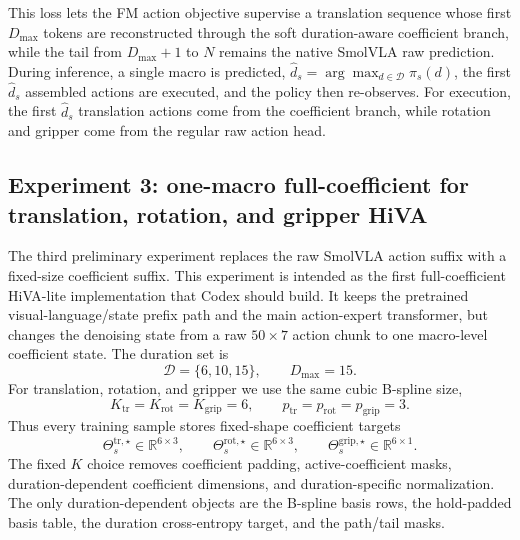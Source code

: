 \documentclass[10pt,twocolumn,letterpaper]{article}
\begin{document}
This loss lets the FM action objective supervise a translation sequence whose first $D_{\max}$ tokens are reconstructed through the soft duration-aware coefficient branch, while the tail from $D_{\max}+1$ to $N$ remains the native SmolVLA raw prediction. During inference, a single macro is predicted, $\hat d_s=\arg\max_{d\in\mathcal{D}}\pi_s(d)$, the first $\hat d_s$ assembled actions are executed, and the policy then re-observes. For execution, the first $\hat d_s$ translation actions come from the coefficient branch, while rotation and gripper come from the regular raw action head.

\subsection{Experiment 3: one-macro full-coefficient for translation, rotation, and gripper HiVA}
\label{app:exp-one-macro-full-coeff}
The third preliminary experiment replaces the raw SmolVLA action suffix with a fixed-size coefficient suffix. This experiment is intended as the first full-coefficient HiVA-lite implementation that Codex should build. It keeps the pretrained visual-language/state prefix path and the main action-expert transformer, but changes the denoising state from a raw $50\times 7$ action chunk to one macro-level coefficient state. The duration set is
\begin{equation}
\mathcal{D}=\{6,10,15\},
\qquad D_{\max}=15.
\end{equation}
For translation, rotation, and gripper we use the same cubic B-spline size,
\begin{equation}
K_{\mathrm{tr}}=K_{\mathrm{rot}}=K_{\mathrm{grip}}=6,
\qquad p_{\mathrm{tr}}=p_{\mathrm{rot}}=p_{\mathrm{grip}}=3.
\end{equation}
Thus every training sample stores fixed-shape coefficient targets
\begin{equation}
\Theta_s^{\mathrm{tr},\star}\in\mathbb{R}^{6\times 3},
\qquad
\Theta_s^{\mathrm{rot},\star}\in\mathbb{R}^{6\times 3},
\qquad
\Theta_s^{\mathrm{grip},\star}\in\mathbb{R}^{6\times 1}.
\end{equation}
The fixed $K$ choice removes coefficient padding, active-coefficient masks, duration-dependent coefficient dimensions, and duration-specific normalization. The only duration-dependent objects are the B-spline basis rows, the hold-padded basis table, the duration cross-entropy target, and the path/tail masks.
\end{document}
